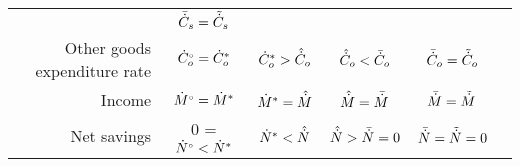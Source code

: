 \begin{landscape}
\begin{table}
\begin{tabular}{r c c c c c}
                                  & $\bar{\dot{C}}_s  = \tilde{\dot{C}}_s$ \\
%
Other goods expenditure rate      & ${}{\dot{C}}^{\scriptscriptstyle \circ}_o  = {\dot{C}}^*_o$         
                                  & ${\dot{C}}^*_o   > \hat{\dot{C}}_o$ 
                                  & $\hat{\dot{C}}_o   < \bar{\dot{C}}_o$ 
                                  & $\bar{\dot{C}}_o  = \tilde{\dot{C}}_o$ \\
%
Income                            & ${}{\dot{M}}^{\scriptscriptstyle \circ} = {\dot{M}}^*$         
                                  & ${\dot{M}}^*  = \hat{\dot{M}}$ 
                                  & $\hat{\dot{M}}  = \bar{\dot{M}}$ 
                                  & $\bar{\dot{M}} = \tilde{\dot{M}}$  \\
%
Net savings                       & 0 = ${}{\dot{N}}^{\scriptscriptstyle \circ} <   {\dot{N}}^*$         
                                  & ${\dot{N}}^*      <   \hat{\dot{N}}$ 
                                  & $\hat{\dot{N}}      >   \bar{\dot{N}} = 0$ 
                                  & $\bar{\dot{N}}    =   \tilde{\dot{N}} = 0$  \\
\bottomrule
\end{tabular}


\end{table}

\end{landscape}
